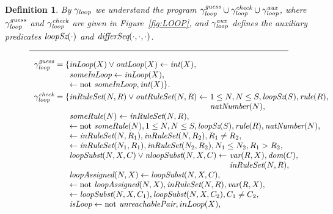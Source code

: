 \documentclass{tlp}
\newcommand{\naf}{\mathrm{not}}
\newcommand{\Loop}{\mathit{LOOP}} \newcommand{\LoopGuess}{\mathit{LOOP_{guess}}} \newcommand{\LoopCheck}{\mathit{LOOP_{check}}} \newcommand{\LoopAux}{\mathit{LOOP_{aux}}} \renewcommand{\Loop}{\gamma_\mathit{loop}} \renewcommand{\LoopGuess}{\Loop^\mathit{guess}} \renewcommand{\LoopCheck}{\Loop^\mathit{check}} \renewcommand{\LoopAux}{\Loop^\mathit{aux}}
\renewcommand{\mathit}[1]{{\text{\it{#1}}}}
\newtheorem{definition}{Definition}
\begin{document}
\begin{definition}\label{def:loop}
By $\Loop$ we understand the program $ \LoopGuess  \cup \LoopCheck \cup \LoopAux$, where $\LoopGuess$ and $\LoopCheck$ are given in Figure~\ref{fig:LOOP}, and $\LoopAux$ defines the auxiliary predicates $\mathit{loopSz}(\cdot)$ and $\mathit{differSeq}(\cdot,\cdot,\cdot)$. 
\begin{figure}[t]
\begin{small}
\hrule
$$\begin{array}{r@{}l}
 \LoopGuess  =  \{ & \mathit{inLoop}(X) \vee \mathit{outLoop}(X) \leftarrow \mathit{int}(X),
\\
&
\mathit{someInLoop} \leftarrow \mathit{inLoop}(X),
\\
&
\leftarrow \naf\ \mathit{someInLoop}, \mathit{int}(X) \}\mbox{.}\\[.3em]
\LoopCheck  =  \{ &  
 \begin{array}[t]{@{}l@{}l}
 \mathit{inRuleSet}(N,R) \vee \mathit{outRuleSet}(N,R) \leftarrow\ & 1 \leq N, N \leq S,
		  \mathit{loopSz}(S), \mathit{rule}(R), \\&
		  \mathit{natNumber}(N),
\end{array}\\
& \mathit{someRule}(N) \leftarrow \mathit{inRuleSet}(N,R), \\
&\leftarrow \naf\ \mathit{someRule}(N), 1 \leq N, N \leq S, \mathit{loopSz}(S),  \mathit{rule}(R), \mathit{natNumber}(N), \\
&\leftarrow \mathit{inRuleSet}(N,R_{1}), \mathit{inRuleSet}(N,R_{2}), R_{1} \neq R_{2},  \\ 
&\leftarrow  \mathit{inRuleSet}(N_{1},R_{1}), \mathit{inRuleSet}(N_{2},R_{2}), N_{1} \leq N_{2}, R_{1} > R_{2}, \\
&\begin{array}[t]{@{}l@{}l}
\mathit{loopSubst}(N,X,C) \vee \mathit{nloopSubst}(N,X,C) \leftarrow\ &\mathit{var}(R,X),\mathit{dom}(C),\\&
\mathit{inRuleSet}(N,R),\end{array}\\
&\mathit{loopAssigned}(N,X) \leftarrow \mathit{loopSubst}(N,X,C), \\ 
&\leftarrow \naf\ \mathit{loopAssigned}(N,X), \mathit{inRuleSet}(N,R), \mathit{var}(R,X), \\ 
&\leftarrow \mathit{loopSubst}(N,X,C_{1}), \mathit{loopSubst}(N,X,C_{2}), C_{1} \neq C_{2},  \\&\mathit{isLoop}  \leftarrow \naf\ \mathit{unreachablePair} , inLoop(X), \\ 

\end{array}$$
\end{small}
\end{figure}
\end{definition}
\end{document}
